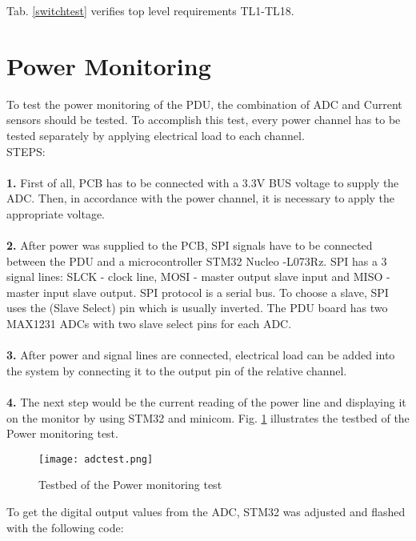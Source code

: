	Tab. \ref{switchtest} verifies top level requirements TL1-TL18.
	
	
	\section{Power Monitoring}
	
	To test the power monitoring of the PDU, the combination of ADC and Current sensors should be tested. To accomplish this test, every power channel has to be tested separately by applying electrical load to each channel. \\
	\newpage
	STEPS:\\ \\
	\textbf{1.} First of all, PCB has to be connected with a 3.3V BUS voltage to supply the ADC. Then, in accordance with the power channel, it is necessary to apply the appropriate voltage. \\ \\
	\textbf{2.} After power was supplied to the PCB, SPI signals have to be connected between the PDU and a microcontroller STM32 Nucleo -L073Rz. SPI has a 3 signal lines: SLCK - clock line, MOSI - master output slave input and MISO - master input slave output. SPI protocol is a serial bus. To choose a slave, SPI uses the (Slave Select) pin which is usually inverted. The PDU board has two MAX1231 ADCs with two slave select pins for each ADC.\\ \\
	\textbf{3.} After power and signal lines are connected, electrical load can be added into the system by connecting it to the output pin of the relative channel.\\ \\
	\textbf{4.} The next step would be the current reading of the power line and displaying it on the monitor by using STM32 and minicom.
	  Fig. \ref{fig: adctest} illustrates the testbed of the Power monitoring test.
	\begin{figure}[h]
		\centering
		\texttt{[image: adctest.png]}
		\caption{Testbed of the Power monitoring test}
		\label{fig: adctest}
	\end{figure}
	 \newpage
	 To get the digital output values from the ADC, STM32 was adjusted and flashed with the following code:
	 
